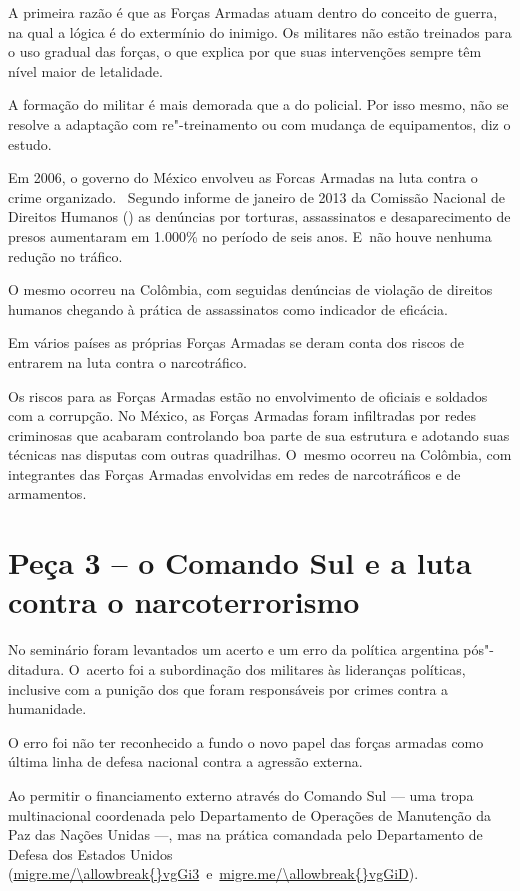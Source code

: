 A primeira razão é que as Forças Armadas atuam dentro do conceito de
guerra, na qual a lógica é do extermínio do inimigo. Os militares não
estão treinados para o uso gradual das forças, o que explica por que
suas intervenções sempre têm nível maior de letalidade.

A formação do militar é mais demorada que a do policial. Por isso mesmo,
não se resolve a adaptação com re"-treinamento ou com mudança de
equipamentos, diz o estudo.

Em 2006, o governo do México envolveu as Forcas Armadas na luta contra o
crime organizado.~ Segundo informe de janeiro de 2013 da Comissão
Nacional de Direitos Humanos () as denúncias por torturas,
assassinatos e desaparecimento de presos aumentaram em 1.000\% no
período de seis anos. E~não houve nenhuma redução no tráfico.

O mesmo ocorreu na Colômbia, com seguidas denúncias de violação de
direitos humanos chegando à prática de assassinatos como indicador de
eficácia.

Em vários países as próprias Forças Armadas se deram conta dos riscos de
entrarem na luta contra o narcotráfico.

Os riscos para as Forças Armadas estão no envolvimento de oficiais e
soldados com a corrupção. No México, as Forças Armadas foram infiltradas
por redes criminosas que acabaram controlando boa parte de sua estrutura
e adotando suas técnicas nas disputas com outras quadrilhas. O~mesmo
ocorreu na Colômbia, com integrantes das Forças Armadas envolvidas em
redes de narcotráficos e de armamentos.

\section{Peça 3 -- o Comando Sul e a luta contra o narcoterrorismo}

No seminário foram levantados um acerto e um erro da política argentina
pós"-ditadura. O~acerto foi a subordinação dos militares às lideranças
políticas, inclusive com a punição dos que foram responsáveis por crimes
contra a humanidade.

O erro foi não ter reconhecido a fundo o novo papel das forças armadas
como última linha de defesa nacional contra a agressão externa.

Ao permitir o financiamento externo através do Comando Sul --- uma tropa
multinacional coordenada pelo Departamento de Operações de Manutenção da
Paz das Nações Unidas \mbox{---,} mas na prática comandada pelo Departamento de
Defesa dos Estados Unidos
(\url{migre.me/\allowbreak{}vgGi3}~e~\url{migre.me/\allowbreak{}vgGiD}).

